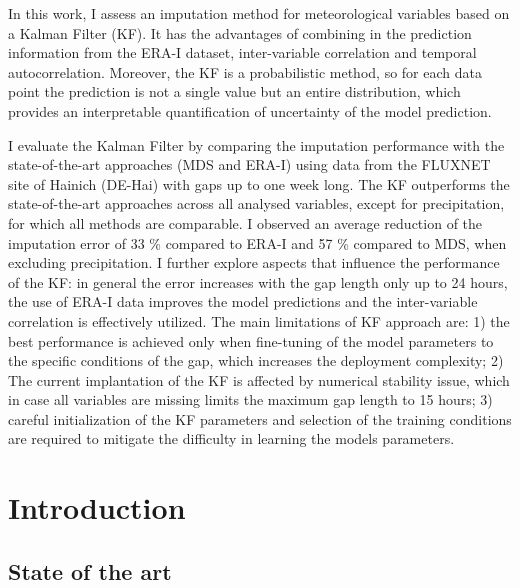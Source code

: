 \documentclass{article}
\let\Oldsection\section
\renewcommand{\section}{\FloatBarrier\Oldsection}
\let\Oldsubsection\subsection
\renewcommand{\subsection}{\FloatBarrier\Oldsubsection}
\begin{document}
In this work, I assess an imputation method for meteorological variables based on a Kalman Filter (KF). It has the advantages of combining in the prediction information from the ERA-I dataset, inter-variable correlation and  temporal autocorrelation. Moreover, the KF is a probabilistic method, so for each data point the prediction is not a single value but an entire distribution, which provides an interpretable quantification of uncertainty of the model prediction.

I evaluate the Kalman Filter by  comparing the imputation performance with the state-of-the-art approaches (MDS and ERA-I) using data from the FLUXNET site of Hainich (DE-Hai) with gaps up to one week long. The KF outperforms the state-of-the-art approaches across all analysed variables, except for precipitation, for which all methods are comparable. I observed an average reduction of the imputation error of 33 \% compared to ERA-I and  57 \% compared to MDS, when excluding precipitation. I further explore aspects that influence the performance of the KF: in general the error increases with the gap length only up to 24 hours, the use of ERA-I data improves the model predictions and the inter-variable correlation is effectively utilized.
The main limitations of KF approach are: 1) the best performance is achieved only when fine-tuning of the model parameters to the specific conditions of the gap, which increases the deployment complexity; 2) The current implantation of the KF is affected by numerical stability issue, which in case all variables are missing limits the maximum gap length to 15 hours; 3) careful initialization of the KF parameters and selection of the training conditions are required to mitigate the difficulty in learning the models parameters. 

\section{Introduction}

\subsection{State of the art}
\end{document}
